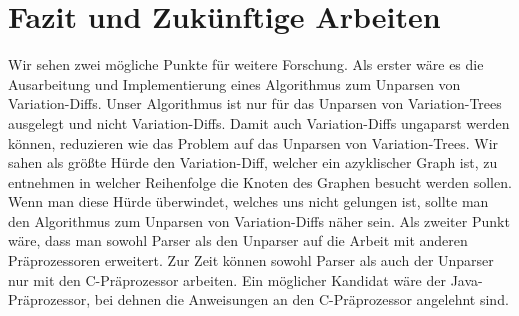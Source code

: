 \chapter{Fazit und Zukünftige Arbeiten}



Wir sehen zwei mögliche Punkte für weitere Forschung. Als erster wäre es die Ausarbeitung und Implementierung eines Algorithmus zum Unparsen von Variation-Diffs. Unser Algorithmus ist nur für das Unparsen von Variation-Trees ausgelegt und nicht Variation-Diffs. Damit auch Variation-Diffs ungaparst werden können, reduzieren wie das Problem auf das Unparsen von Variation-Trees. Wir sahen als größte Hürde den Variation-Diff, welcher ein azyklischer Graph ist, zu entnehmen in welcher Reihenfolge die Knoten des Graphen besucht werden sollen. Wenn man diese Hürde überwindet, welches uns nicht gelungen ist, sollte man den Algorithmus zum Unparsen von Variation-Diffs näher sein. Als zweiter Punkt wäre, dass man sowohl Parser als den Unparser auf die Arbeit mit anderen Präprozessoren erweitert. Zur Zeit können sowohl Parser als auch der Unparser nur mit den C-Präprozessor arbeiten. Ein möglicher Kandidat wäre der Java-Präprozessor, bei dehnen die Anweisungen an den C-Präprozessor angelehnt sind. 












